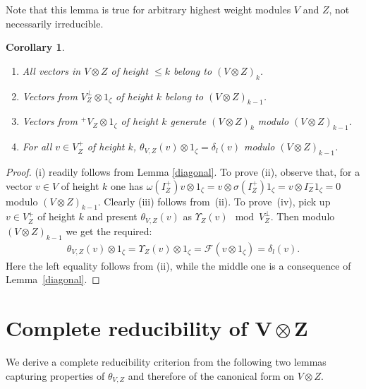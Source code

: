 \documentclass[pdftex]{sigma}
\numberwithin{equation}{section}
\newtheorem{Corollary}[Theorem]{Corollary}
\begin{document}
Note that this lemma is true for arbitrary highest weight modules $V$ and $Z$, not necessarily irreducible.
\begin{Corollary}\label{two-filtrations}\quad
\begin{enumerate}\itemsep=0pt
 \item[$i)$] All vectors in $V\otimes Z$ of height $\leqslant k$ belong to $(V\otimes Z)_{k}$.
\item[$ii)$] Vectors from $V^\perp_Z\otimes 1_\zeta$ of height $k$ belong to $(V\otimes Z)_{k-1}$.
 \item[$iii)$] Vectors from ${}^+\!V_Z\otimes 1_\zeta$ of height $k$ generate $(V\otimes Z)_k$ modulo $(V\otimes Z)_{k-1}$.
\item[$iv)$] For all $v\in V^+_Z$ of height $k$, $\theta_{V,Z}(v)\otimes 1_\zeta=\delta_l(v)$ modulo $(V\otimes Z)_{k-1}$.
\end{enumerate}
\end{Corollary}
\begin{proof}(i) readily follows from Lemma \ref{diagonal}. To prove (ii), observe that, for a vector $v\in V$ of height $k$ one has $\omega(I^+_Z)v\otimes 1_\zeta=v\otimes \sigma(I^+_Z) 1_\zeta=v\otimes I^-_Z 1_\zeta =0$
modulo $(V\otimes Z)_{k-1}$. Clearly (iii) follows from~(ii). To prove~(iv), pick up $v\in V^+_Z$ of height $k$ and present $\theta_{V,Z}(v)$ as $\Upsilon_Z(v) \mod V^\perp_Z$. Then modulo $(V\otimes Z)_{k-1}$ we get the required:
\begin{gather*}
\theta_{V,Z}(v)\otimes 1_\zeta=\Upsilon_Z(v) \otimes 1_\zeta = \mathcal{F}(v\otimes 1_\zeta)=\delta_l(v).
\end{gather*}
Here the left equality follows from (ii), while the middle one is a consequence of Lemma~\ref{diagonal}.
\end{proof}

\section[Complete reducibility of $V\otimes Z$]{Complete reducibility of $\boldsymbol{V\otimes Z}$}
We derive a complete reducibility criterion from the following two lemmas capturing properties of $\theta_{V,Z}$ and therefore of the canonical form on $V\otimes Z$.
\end{document}

